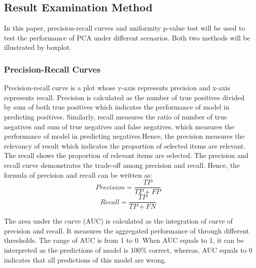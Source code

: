 \documentclass[12pt]{article}
\begin{document}
\subsection{Result Examination Method}

In this paper, precision-recall curves and uniformity p-value test will be used to test the performance of PCA under different scenarios. Both two methods will be illustrated by boxplot.

\subsubsection{Precision-Recall Curves}

Precision-recall curve is a plot whose y-axis represents precision and x-axis represents recall. Precision is calculated as the number of true positives divided by sum of both true positives which indicates the performance of model in predicting positives. Similarly, recall measures the ratio of number of true negatives and sum of true negatives and false negatives, which measures the performance of model in predicting negatives.Hence, the precision measures the relevancy of result which indicates the proportion of selected items are relevant. The recall shows the proportion of relevant items are selected. The precision and recall curve demonstrates the trade-off among precision and recall. Hence, the formula of precision and recall can be written as:
$$Precision=\frac{TP}{TP + FP}$$
$$Recall=\frac{TP}{TP + FN}$$

The area under the curve (AUC) is calculated as the integration of curve of precision and recall. It measures the aggregated performance of through different thresholds. The range of AUC is from 1 to 0. When AUC equals to 1, it can be interpreted as the predictions of model is $100\%$ correct, whereas, AUC equals to 0 indicates that all predictions of this model are wrong. 
\end{document}
